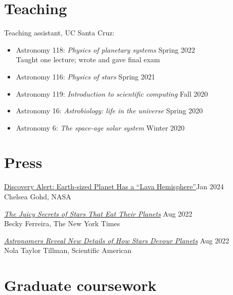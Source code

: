 \documentclass[12pt]{article}
\begin{document}
\section{Teaching}
Teaching assistant, UC Santa Cruz:
\begin{itemize}
\item Astronomy 118: \textit{Physics of planetary systems} \hfill Spring 2022\\Taught one lecture; wrote and gave final exam
\item Astronomy 116: \textit{Physics of stars} \hfill Spring 2021
\item Astronomy 119: \textit{Introduction to scientific computing} \hfill Fall 2020
\item Astronomy 16: \textit{Astrobiology: life in the universe} \hfill Spring 2020
\item Astronomy 6: \textit{The space-age solar system} \hfill Winter 2020
\end{itemize}

\ifdefined\withpress{}
\section{Press}
\href{https://science.nasa.gov/universe/exoplanets/discovery-alert-earth-sized-planet-has-a-lava-hemisphere/}{Discovery Alert: Earth-sized Planet Has a ``Lava Hemisphere''}\hfill Jan 2024\\
Chelsea Gohd, NASA

\href{https://www.nytimes.com/2022/08/19/science/stars-planets-engulfment.html}{\textit{The Juicy Secrets of Stars That Eat Their Planets}} \hfill Aug 2022\\
Becky Ferreira, The New York Times

\href{https://www.scientificamerican.com/article/astronomers-reveal-new-details-of-how-stars-devour-planets/}{\textit{Astronomers Reveal New Details of How Stars Devour Planets}} \hfill Aug 2022\\
Nola Taylor Tillman, Scientific American

\else\fi

\ifdefined\withcourses{}
\section{Graduate coursework}
\end{document}
